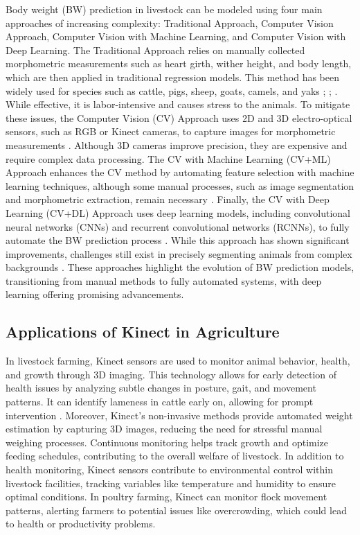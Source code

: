 {Body weight (BW) prediction in livestock can be modeled using four main approaches of increasing complexity: Traditional Approach, Computer Vision Approach, Computer Vision with Machine Learning, and Computer Vision with Deep Learning. The Traditional Approach relies on manually collected morphometric measurements such as heart girth, wither height, and body length, which are then applied in traditional regression models. This method has been widely used for species such as cattle, pigs, sheep, goats, camels, and yaks \citep{franco2017evaluation}; \citep{fadlelmoula2020prediction}; \citep{yan2019body}. While effective, it is labor-intensive and causes stress to the animals. To mitigate these issues, the Computer Vision (CV) Approach uses 2D and 3D electro-optical sensors, such as RGB or Kinect cameras, to capture images for morphometric measurements \citep{ozkaya2013prediction}. Although 3D cameras improve precision, they are expensive and require complex data processing. The CV with Machine Learning (CV+ML) Approach enhances the CV method by automating feature selection with machine learning techniques, although some manual processes, such as image segmentation and morphometric extraction, remain necessary \citep{tasdemir2019ann}. Finally, the CV with Deep Learning (CV+DL) Approach uses deep learning models, including convolutional neural networks (CNNs) and recurrent convolutional networks (RCNNs), to fully automate the BW prediction process \citep{gjergji2020deep}. While this approach has shown significant improvements, challenges still exist in precisely segmenting animals from complex backgrounds \citep{shukla2016metric}. These approaches highlight the evolution of BW prediction models, transitioning from manual methods to fully automated systems, with deep learning offering promising advancements.

\subsection{Applications of Kinect in Agriculture}

In livestock farming, Kinect sensors are used to monitor animal behavior, health, and growth through 3D imaging. This technology allows for early detection of health issues by analyzing subtle changes in posture, gait, and movement patterns. It can identify lameness in cattle early on, allowing for prompt intervention \citep{singh2022smart}. Moreover, Kinect’s non-invasive methods provide automated weight estimation by capturing 3D images, reducing the need for stressful manual weighing processes. Continuous monitoring helps track growth and optimize feeding schedules, contributing to the overall welfare of livestock. In addition to health monitoring, Kinect sensors contribute to environmental control within livestock facilities, tracking variables like temperature and humidity to ensure optimal conditions. In poultry farming, Kinect can monitor flock movement patterns, alerting farmers to potential issues like overcrowding, which could lead to health or productivity problems.

}
